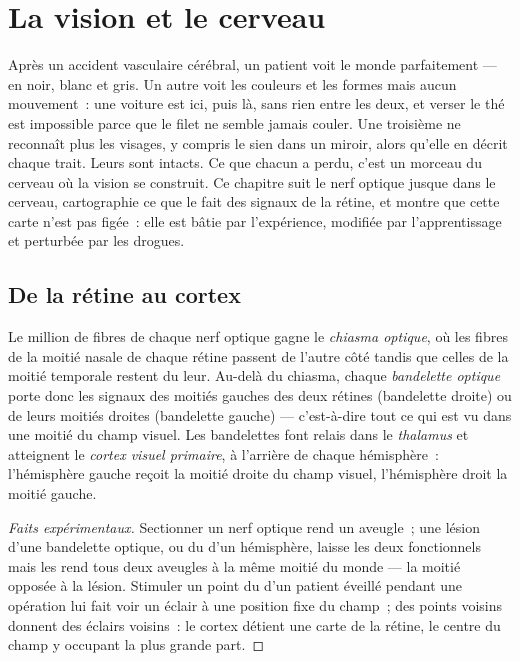 \chapter{La vision et le cerveau}\label{ch:g11:vision-and-brain}

Après un accident vasculaire cérébral, un patient voit le monde
parfaitement --- en noir, blanc et gris. Un autre voit les couleurs et
les formes mais aucun mouvement~: une voiture est ici, puis là, sans
rien entre les deux, et verser le thé est impossible parce que le filet
ne semble jamais couler. Une troisième ne reconnaît plus les visages, y
compris le sien dans un miroir, alors qu'elle en décrit chaque trait.
Leurs  sont intacts. Ce que chacun a perdu, c'est un morceau du
cerveau où la vision se construit. Ce chapitre suit le nerf optique
jusque dans le cerveau, cartographie ce que le  fait des
signaux de la rétine, et montre que cette carte n'est pas figée~: elle
est bâtie par l'expérience, modifiée par l'apprentissage et perturbée
par les drogues.

\section{De la rétine au cortex}

\begin{proposition}\label{prop:g11:vision-and-brain:pathway}
Le million de fibres de chaque nerf optique gagne le
\emph{chiasma optique}, où les fibres de la moitié nasale de chaque
rétine passent de l'autre côté tandis que celles de la moitié temporale
restent du leur. Au-delà du chiasma, chaque \emph{bandelette optique}
porte donc les signaux des moitiés gauches des deux rétines
(bandelette droite) ou de leurs moitiés droites (bandelette gauche)
--- c'est-à-dire tout ce qui est vu dans une moitié du champ visuel.
Les bandelettes font relais dans le \emph{thalamus} et atteignent le
\emph{cortex visuel primaire}, à l'arrière de
chaque hémisphère~: l'hémisphère gauche reçoit la moitié droite du
champ visuel, l'hémisphère droit la moitié gauche.
\end{proposition}
\begin{proof}[Faits expérimentaux]
Sectionner un nerf optique rend un  aveugle~; une lésion d'une
bandelette optique, ou du  d'un hémisphère, laisse les
deux  fonctionnels mais les rend tous deux aveugles à la même
moitié du monde --- la moitié opposée à la lésion. Stimuler un point du
 d'un patient éveillé pendant une opération lui fait voir
un éclair à une position fixe du champ~; des points voisins donnent des
éclairs voisins~: le cortex détient une carte de la rétine, le centre
du champ y occupant la plus grande part.
\end{proof}

